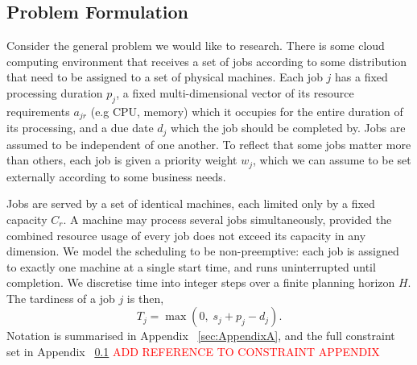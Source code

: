 \documentclass[12pt]{article}
\begin{document}
\subsection{Problem Formulation}
Consider the general problem we would like to research. There is some cloud computing environment that receives a set of jobs according to some distribution that need to be assigned to a set of physical machines. Each job $j$ has a fixed processing duration $p_j$, a fixed multi-dimensional vector of its resource requirements $a_{jr}$ (e.g CPU, memory) which it occupies for the entire duration of its processing, and a due date $d_j$ which the job should be completed by. Jobs are assumed to be independent of one another. To reflect that some jobs matter more than others, each job is given a priority weight $w_j$, which we can assume to be set externally according to some business needs.
\newline

Jobs are served by a set of identical machines, each limited only by a fixed capacity $C_r$. A machine may process several jobs simultaneously, provided the combined resource usage of every job does not exceed its capacity in any dimension. We model the scheduling to be non-preemptive: each job is assigned to exactly one machine at a single start time, and runs uninterrupted until completion. We discretise time into integer steps over a finite planning horizon $H$. The tardiness of a job $j$ is then,
\begin{equation}\label{eq:tardiness}
    T_j = \max\left(0,\; s_j + p_j - d_j\right).
\end{equation}
Notation is summarised in Appendix ~\ref{sec:AppendixA}, and the full constraint set in Appendix ~\ref{} \textcolor{red}{ADD REFERENCE TO CONSTRAINT APPENDIX}
\end{document}
